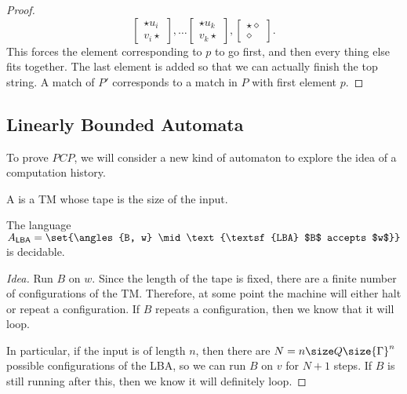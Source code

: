 \documentclass{standalone}
\begin{document}
\begin{proof}
\[{      \begin{bmatrix} \star u_i \\ v_i \star \end{bmatrix}, \dots
      \begin{bmatrix} \star u_k \\ v_k \star \end{bmatrix},
      \begin{bmatrix} \star \diamond \\ \diamond \end{bmatrix}
    }.
  \]
  This forces the element corresponding to \(p\) to go first,
  and then every thing else fits together.
  The last element is added so that we can actually finish the top string.
  A match of \(P'\) corresponds to a match in \(P\) with first element \(p\).
\end{proof}

\subsection{Linearly Bounded Automata}
To prove \(\mathit{PCP}\), we will consider a new kind of automaton
to explore the idea of a computation history.
\begin{definition}
  A  is
  a \textsf{TM} whose tape is the size of the input.
\end{definition}
\begin{proposition}
  The language
  \(A_{\textsf{LBA}} = \set{\angles{B, w} \mid
                            \text{\textsf{LBA} $B$ accepts $w$}}\)
  is decidable.
\end{proposition}
\begin{proof}[Idea]
  Run \(B\) on \(w\).
  Since the length of the tape is fixed,
  there are a finite number of configurations of the \textsf{TM}.
  Therefore, at some point the machine will either
  halt or repeat a configuration.
  If \(B\) repeats a configuration, then we know that it will loop.

  In particular, if the input is of length \(n\),
  then there are \(N = n \size Q \size{\Gamma}^n\) possible configurations
  of the \textsf{LBA}, so we can run \(B\) on \(v\) for \(N + 1\) steps.
  If \(B\) is still running after this, then we know it will definitely loop.
\end{proof}
\end{document}
